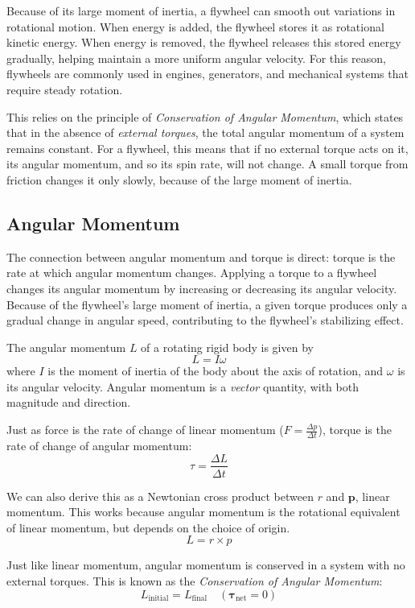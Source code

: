 Because of its large moment of inertia, a flywheel can smooth out variations in rotational motion. When energy is added, the flywheel stores it as rotational kinetic energy. When energy is removed, the flywheel releases this stored energy gradually, helping maintain a more uniform angular velocity. For this reason, flywheels are commonly used in engines, generators, and mechanical systems that require steady rotation.

This relies on the principle of \emph{Conservation of Angular Momentum}, which states that in the absence of \emph{external torques}, the total angular momentum of a system remains constant. For a flywheel, this means that if no external torque acts on it, its
angular momentum, and so its spin rate, will not change. A small torque
from friction changes it only slowly, because of the large moment of
inertia.
\subsection{Angular Momentum}
The connection between angular momentum and torque is direct: torque is the rate at which angular momentum changes. Applying a torque to a flywheel changes its angular momentum by increasing or decreasing its angular velocity. Because of the flywheel's large moment of inertia, a given torque produces only a gradual change in angular speed, contributing to the flywheel's stabilizing effect.
\begin{mdframed}[frametitle = {Angular Momentum and the Conservation of Angular Momentum}, style = important]
The angular momentum \( L \) of a rotating rigid body is given by
\begin{equation}
L = I \omega
\label{eq:angularMomentum1}
\end{equation}
where \( I \) is the moment of inertia of the body about the axis of rotation, and \( \omega \) is its angular velocity. Angular momentum is a \emph{vector} quantity, with both magnitude and direction.

Just as force is the rate of change of linear momentum ($F=\frac{\Delta p}{\Delta t}$), torque is the rate of change of angular momentum:
\begin{equation}
\tau = \frac{\Delta L}{\Delta t}
\label{eq:derivTorque}
\end{equation}

We can also derive this as a Newtonian cross product between $r$ and $\textbf{p}$, linear momentum. This works because angular momentum is the rotational equivalent of linear momentum, but depends on the choice of origin.
\begin{equation}
L = r \times p
\label{eq:angularMomentum2}
\end{equation}

Just like linear momentum, angular momentum is conserved in a system with no external torques. This is known as the \emph{Conservation of Angular Momentum}:
\begin{equation}
L_{\text{initial}} = L_{\text{final}} \quad (\boldsymbol{\tau}_{\text{net}} = 0)
\end{equation}

\end{mdframed}

